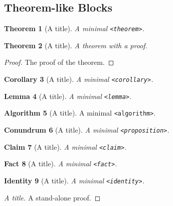 \documentclass{amsart}
\theoremstyle{plain}%
\newtheorem{theorem}{Theorem}[section]
\newtheorem{proposition}[theorem]{Conundrum}
\newtheorem{lemma}[theorem]{Lemma}
\newtheorem{corollary}[theorem]{Corollary}
\newtheorem{claim}[theorem]{Claim}
\newtheorem{fact}[theorem]{Fact}
\newtheorem{identity}[theorem]{Identity}
\theoremstyle{definition}%
\newtheorem{algorithm}[theorem]{Algorithm}
\theoremstyle{remark}%
\newcommand{\mono}[1]{\texttt{#1}}
\numberwithin{equation}{section}
\begin{document}
\subsection{Theorem-like Blocks}\label{block-samples-theorem-like}%
\begin{theorem}[A title]\label{block-samples-theorem-like-2}%
%
A minimal \mono{<theorem>}.%
\end{theorem}
\begin{theorem}[A title]\label{block-samples-theorem-like-3}%
%
A theorem with a proof.%
\end{theorem}
\begin{proof}\label{block-samples-theorem-like-3-3}%
The proof of the theorem.%
\end{proof}
\begin{corollary}[A title]\label{block-samples-theorem-like-4}%
%
A minimal \mono{<corollary>}.%
\end{corollary}
\begin{lemma}[A title]\label{block-samples-theorem-like-5}%
%
A minimal \mono{<lemma>}.%
\end{lemma}
\begin{algorithm}[A title]\label{block-samples-theorem-like-6}%
%
A minimal \mono{<algorithm>}.%
\end{algorithm}
\begin{proposition}[A title]\label{block-samples-theorem-like-7}%
%
A minimal \mono{<proposition>}.%
\end{proposition}
\begin{claim}[A title]\label{block-samples-theorem-like-8}%
%
A minimal \mono{<claim>}.%
\end{claim}
\begin{fact}[A title]\label{block-samples-theorem-like-9}%
%
A minimal \mono{<fact>}.%
\end{fact}
\begin{identity}[A title]\label{block-samples-theorem-like-10}%
%
A minimal \mono{<identity>}.%
\end{identity}
\begin{proof}[A title]\label{block-samples-theorem-like-11}%
A stand-alone proof.%
\end{proof}
%
%
\typeout{************************************************}
\typeout{************************************************}
%
\end{document}
